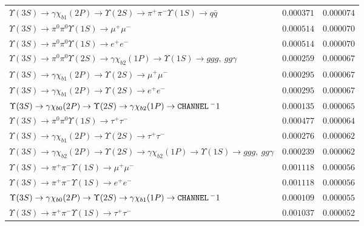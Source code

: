 \documentclass[12pt]{article}
\begin{document}
\begin{tabular}{p{4.7in} l l}
$   \Upsilon(3S) \to \gamma \chi_{b1}(2P) \to \Upsilon(2S) \to \pi^+ \pi^- \Upsilon(1S) \to q\bar{q}                     $ & $   0.000371     $ & $   0.000074    $ \\ 
$   \Upsilon(3S) \to \pi^0 \pi^0 \Upsilon(1S) \to \mu^+ \mu^-                                                            $ & $   0.000514     $ & $   0.000070    $ \\ 
$   \Upsilon(3S) \to \pi^0 \pi^0 \Upsilon(1S) \to e^+ e^-                                                                $ & $   0.000514     $ & $   0.000070    $ \\ 
$   \Upsilon(3S) \to \pi^0 \pi^0 \Upsilon(2S) \to \gamma \chi_{b2}(1P) \to \Upsilon(1S) \to ggg,\ gg\gamma                $ & $   0.000259     $ & $   0.000067    $ \\ 
$   \Upsilon(3S) \to \gamma \chi_{b1}(2P) \to \Upsilon(2S) \to \mu^+ \mu^-                                               $ & $   0.000295    $ & $   0.000067    $ \\ 
$   \Upsilon(3S) \to \gamma \chi_{b1}(2P) \to \Upsilon(2S) \to e^+ e^-                                                   $ & $   0.000295    $ & $   0.000067    $ \\ 
$   \Upsilon(3S) \to \gamma \chi_{b0}(2P) \to \Upsilon(2S) \to \gamma \chi_{b2}(1P) \to {\tt \small CHANNEL} \, ^-1                 $ & $   0.000135    $ & $   0.000065    $ \\ 
$   \Upsilon(3S) \to \pi^0 \pi^0 \Upsilon(1S) \to \tau^+ \tau^-                                                          $ & $   0.000477    $ & $   0.000064    $ \\ 
$   \Upsilon(3S) \to \gamma \chi_{b1}(2P) \to \Upsilon(2S) \to \tau^+ \tau^-                                             $ & $   0.000276     $ & $   0.000062    $ \\ 
$   \Upsilon(3S) \to \gamma \chi_{b2}(2P) \to \Upsilon(2S) \to \gamma \chi_{b2}(1P) \to \Upsilon(1S) \to ggg,\ gg\gamma   $ & $   0.000239    $ & $   0.000062    $ \\ 
$   \Upsilon(3S) \to \pi^+ \pi^- \Upsilon(1S) \to \mu^+ \mu^-                                                            $ & $   0.001118     $ & $   0.000056    $ \\ 
$   \Upsilon(3S) \to \pi^+ \pi^- \Upsilon(1S) \to e^+ e^-                                                                $ & $   0.001118     $ & $   0.000056    $ \\ 
$   \Upsilon(3S) \to \gamma \chi_{b0}(2P) \to \Upsilon(2S) \to \gamma \chi_{b1}(1P) \to {\tt \small CHANNEL} \, ^-1                 $ & $   0.000109    $ & $   0.000055     $ \\ 
$   \Upsilon(3S) \to \pi^+ \pi^- \Upsilon(1S) \to \tau^+ \tau^-                                                          $ & $   0.001037      $ & $   0.000052    $ \\ 
\end{tabular}
\end{document}
